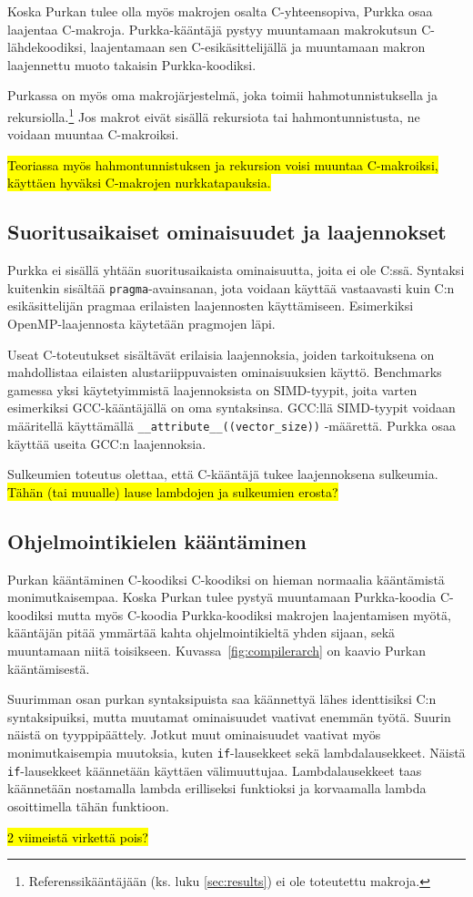 Koska Purkan tulee olla myös makrojen osalta C-yhteensopiva, Purkka osaa
laajentaa C-makroja. Purkka-kääntäjä pystyy muuntamaan makrokutsun
C-lähdekoodiksi, laajentamaan sen C-esikäsittelijällä ja muuntamaan makron
laajennettu muoto takaisin Purkka-koodiksi.

Purkassa on myös oma makrojärjestelmä, joka toimii hahmotunnistuksella ja
rekursiolla.\footnote{Referenssikääntäjään (ks. luku \ref{sec:results}) ei ole
toteutettu makroja.} Jos makrot eivät sisällä rekursiota tai hahmontunnistusta,
ne voidaan muuntaa C-makroiksi.

\hl{Teoriassa myös hahmontunnistuksen ja rekursion voisi muuntaa C-makroiksi,
käyttäen hyväksi C-makrojen nurkkatapauksia.}

\subsection{Suoritusaikaiset ominaisuudet ja laajennokset}

Purkka ei sisällä yhtään suoritusaikaista ominaisuutta, joita ei ole C:ssä.
Syntaksi kuitenkin sisältää \texttt{pragma}-avainsanan, jota voidaan käyttää
vastaavasti kuin C:n esikäsittelijän pragmaa erilaisten laajennosten
käyttämiseen. Esimerkiksi OpenMP-laajennosta käytetään pragmojen läpi.

Useat C-toteutukset sisältävät erilaisia laajennoksia, joiden tarkoituksena on
mahdollistaa eilaisten alustariippuvaisten ominaisuuksien käyttö. Benchmarks
gamessa yksi käytetyimmistä laajennoksista on SIMD-tyypit, joita varten
esimerkiksi GCC-kääntäjällä on oma syntaksinsa. GCC:llä SIMD-tyypit voidaan
määritellä käyttämällä \texttt{\_\_attribute\_\_((vector\_size))} -määrettä.
Purkka osaa käyttää useita GCC:n laajennoksia.

Sulkeumien toteutus olettaa, että C-kääntäjä tukee laajennoksena sulkeumia.
\hl{Tähän (tai muualle) lause lambdojen ja sulkeumien erosta?}

\subsection{Ohjelmointikielen kääntäminen}

Purkan kääntäminen C-koodiksi C-koodiksi on hieman normaalia kääntämistä
monimutkaisempaa. Koska Purkan tulee pystyä muuntamaan Purkka-koodia C-koodiksi
mutta myös C-koodia Purkka-koodiksi makrojen laajentamisen myötä, kääntäjän
pitää ymmärtää kahta ohjelmointikieltä yhden sijaan, sekä muuntamaan niitä
toisikseen. Kuvassa~\ref{fig:compilerarch} on kaavio Purkan kääntämisestä.

Suurimman osan purkan syntaksipuista saa käännettyä lähes identtisiksi C:n
syntaksipuiksi, mutta muutamat ominaisuudet vaativat enemmän työtä. Suurin
näistä on tyyppipäättely. Jotkut muut ominaisuudet vaativat myös
monimutkaisempia muutoksia, kuten \texttt{if}-lausekkeet sekä lambdalausekkeet.
Näistä \texttt{if}-lausekkeet käännetään käyttäen välimuuttujaa.
Lambdalausekkeet taas käännetään nostamalla lambda erilliseksi funktioksi ja
korvaamalla lambda osoittimella tähän funktioon.

\hl{2 viimeistä virkettä pois?}
